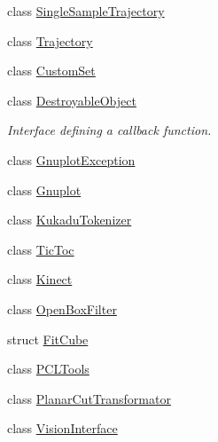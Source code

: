 \begin{DoxyCompactItemize}
class \hyperlink{classkukadu_1_1SingleSampleTrajectory}{Single\-Sample\-Trajectory}
\item 
class \hyperlink{classkukadu_1_1Trajectory}{Trajectory}
\item 
class \hyperlink{classkukadu_1_1CustomSet}{Custom\-Set}
\item 
class \hyperlink{classkukadu_1_1DestroyableObject}{Destroyable\-Object}
\begin{DoxyCompactList}\small\item\em Interface defining a callback function. \end{DoxyCompactList}\item 
class \hyperlink{classkukadu_1_1GnuplotException}{Gnuplot\-Exception}
\item 
class \hyperlink{classkukadu_1_1Gnuplot}{Gnuplot}
\item 
class \hyperlink{classkukadu_1_1KukaduTokenizer}{Kukadu\-Tokenizer}
\item 
class \hyperlink{classkukadu_1_1TicToc}{Tic\-Toc}
\item 
class \hyperlink{classkukadu_1_1Kinect}{Kinect}
\item 
class \hyperlink{classkukadu_1_1OpenBoxFilter}{Open\-Box\-Filter}
\item 
struct \hyperlink{structkukadu_1_1FitCube}{Fit\-Cube}
\item 
class \hyperlink{classkukadu_1_1PCLTools}{P\-C\-L\-Tools}
\item 
class \hyperlink{classkukadu_1_1PlanarCutTransformator}{Planar\-Cut\-Transformator}
\item 
class \hyperlink{classkukadu_1_1VisionInterface}{Vision\-Interface}
\end{DoxyCompactItemize}

